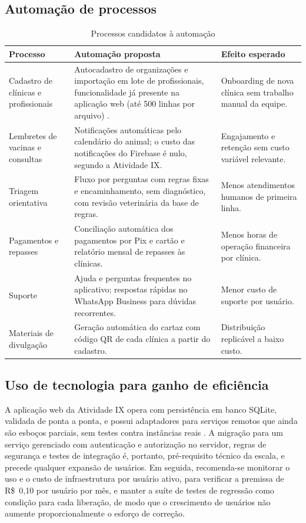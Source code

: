 \subsection{Automação de processos}

\begin{table}[htb]
\centering
\caption{Processos candidatos à automação}
\label{tab:automacao}
\begin{tabularx}{\textwidth}{L{3.2cm} Y Y}
\toprule
\textbf{Processo} & \textbf{Automação proposta} & \textbf{Efeito esperado}\\
\midrule
Cadastro de clínicas e profissionais & Autocadastro de organizações e importação em lote de profissionais, funcionalidade já presente na aplicação web (até 500 linhas por arquivo) \cite{cassino2026repo}. & Onboarding de nova clínica sem trabalho manual da equipe.\\
Lembretes de vacinas e consultas & Notificações automáticas pelo calendário do animal; o custo das notificações do Firebase é nulo, segundo a Atividade IX. & Engajamento e retenção sem custo variável relevante.\\
Triagem orientativa & Fluxo por perguntas com regras fixas e encaminhamento, sem diagnóstico, com revisão veterinária da base de regras. & Menos atendimentos humanos de primeira linha.\\
Pagamentos e repasses & Conciliação automática dos pagamentos por Pix e cartão e relatório mensal de repasses às clínicas. & Menos horas de operação financeira por clínica.\\
Suporte & Ajuda e perguntas frequentes no aplicativo; respostas rápidas no WhatsApp Business para dúvidas recorrentes. & Menor custo de suporte por usuário.\\
Materiais de divulgação & Geração automática do cartaz com código QR de cada clínica a partir do cadastro. & Distribuição replicável a baixo custo.\\
\bottomrule
\end{tabularx}
\fonteautores
\end{table}

\subsection{Uso de tecnologia para ganho de eficiência}

A aplicação web da Atividade IX opera com persistência em banco SQLite, validada de ponta a ponta, e possui adaptadores para serviços remotos que ainda são esboços parciais, sem testes contra instâncias reais \cite{cassino2026repo}. A migração para um serviço gerenciado com autenticação e autorização no servidor, regras de segurança e testes de integração é, portanto, pré-requisito técnico da escala, e precede qualquer expansão de usuários. Em seguida, recomenda-se monitorar o uso e o custo de infraestrutura por usuário ativo, para verificar a premissa de R\$~0,10 por usuário por mês, e manter a suíte de testes de regressão como condição para cada liberação, de modo que o crescimento de usuários não aumente proporcionalmente o esforço de correção.

